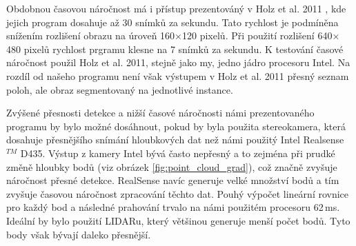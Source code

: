\documentclass[twoside]{ctuthesis}
\begin{document}
Obdobnou časovou náročnost má i přístup prezentováný v Holz et al. 2011 \cite{holz2011real}, kde jejich program dosahuje až 30 snímků za sekundu. Tato rychlost je podmíněna snížením rozlišení obrazu na úroveň 160$\times$120 pixelů. Při použití rozlišení 640$\times$480 pixelů rychlost prgramu klesne na 7 snímků za sekundu. K testování časové náročnost použil Holz et al. 2011\cite{holz2011real}, stejně jako my, jedno jádro procesoru Intel\textregistered{}. Na rozdíl od našeho programu není však výstupem v Holz et al. 2011 \cite{holz2011real} přesný seznam poloh, ale obraz segmentovaný na jednotlivé instance.

Zvýšené přesnosti detekce a nižší časové náročnosti námi prezentovaného programu by bylo možné dosáhnout, pokud by byla použita stereokamera, která dosahuje přesnějšího snímání hloubkových dat než námi použitý Intel\textregistered{} Realsense$^{TM}$ D435. Výstup z kamery Intel bývá často nepřesný a to zejména při prudké změně hloubky bodů (viz obrázek \ref{fig:point_cloud_grad}), což značně zvyšuje náročnost přesné detekce. RealSense navíc generuje velké množství bodů a tím zvyšuje časovou náročnost zpracování těchto dat. Pouhý výpočet lineární rovnice pro každý bod a následné prahování trvalo na námi použitém procesoru 62\,ms. Ideální by bylo použití LIDARu, který většinou generuje menší počet bodů. Tyto body však bývají daleko přesnější.




\end{document}
